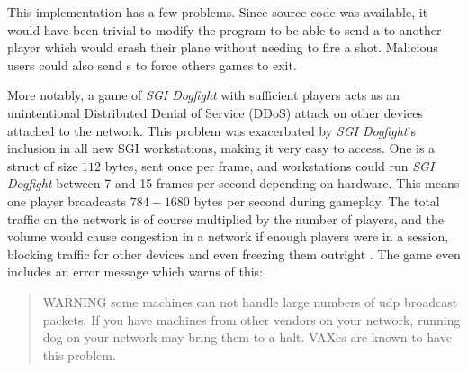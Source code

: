 This implementation has a few problems. Since source code was available, it would have been trivial to modify the program to be able to send a  to another player which would crash their plane without needing to fire a shot. Malicious users could also send s to force others games to exit. 

More notably, a game of \textit{SGI Dogfight} with sufficient players acts as an unintentional Distributed Denial of Service (DDoS) attack on other devices attached to the network. 
This problem was exacerbated by \textit{SGI Dogfight}'s inclusion in all new SGI workstations, making it very easy to access. One  is a struct of size $112$ bytes, sent once per frame, and workstations could run \textit{SGI Dogfight} between 7 and 15 frames per second depending on hardware. This means one player broadcasts $784-1680$ bytes per second during gameplay. The total traffic on the network is of course multiplied by the number of players, and the volume would cause congestion in a network if enough players were in a session, blocking traffic for other devices and even freezing them outright \cite{mace}. The game even includes an error message which warns of this:

\begin{quote}
WARNING some machines can not handle large numbers of udp
broadcast packets.  If you have machines from other vendors
on your network, running dog on your network may bring them
to a halt.  VAXes are known to have this problem.
\end{quote}

\cite{dogsrc}
